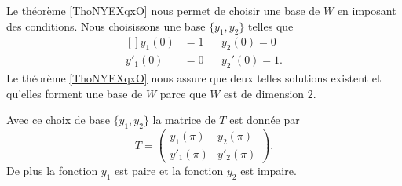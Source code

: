 Le théorème \ref{ThoNYEXqxO} nous permet de choisir une base de \( W\) en imposant des conditions. Nous choisissons une base \( \{ y_1,y_2 \}\) telles que
\begin{equation}
    \begin{aligned}[]
        y_1(0)&=1       &&  y_2(0)=0\\
        y'_1(0)&=0      &&  y_2'(0)=1.
    \end{aligned}
\end{equation}
Le théorème \ref{ThoNYEXqxO} nous assure que deux telles solutions existent et qu'elles forment une base de \( W\) parce que \( W\) est de dimension \( 2\).

\begin{lemma}   \label{IVLzNaU}
    Avec ce choix de base \( \{ y_1,y_2 \}\) la matrice de \( T\) est donnée par
    \begin{equation}
        T=\begin{pmatrix}
            y_1(\pi)    &   y_2(\pi)    \\ 
            y'_1(\pi)    &   y'_2(\pi)    
        \end{pmatrix}.
    \end{equation}
    De plus la fonction \( y_1\) est paire et la fonction \( y_2\) est impaire.
\end{lemma}

